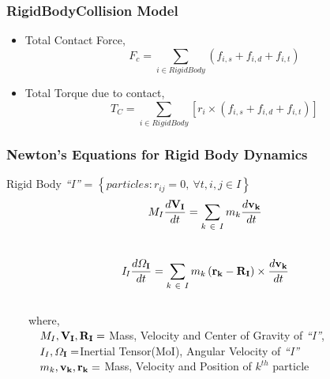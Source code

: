 \documentclass{beamer}
\begin{document}
%
 \begin{frame} %
  \frametitle{RigidBodyCollision Model}
  \begin{itemize}
   \item Total Contact Force, $$F_c = \sum_{i\in RigidBody} \left(f_{i,s} + f_{i,d} + f_{i,t} \right)$$
   \item Total Torque due to contact, $$T_C = \sum_{i\in RigidBody} \left[ r_{i} \times \left(f_{i,s} + f_{i,d} + f_{i,t} \right)\right] $$
  \end{itemize}
 \end{frame}
 
  \begin{frame} %
  \frametitle{Newton's Equations for Rigid Body Dynamics}
    Rigid Body {\it{``I''}} = $\left\lbrace particles : r_{ij} = 0, ~ \forall t , i,j \in I\right\rbrace$ \pause \\
     $$ M_{I}\frac{d{\it{{\bf{V_I}}}}}{dt} = \sum_{k~\in~I} m_{k} \frac{d{\it{{\bf{v_k}}}}}{dt}$$ \\
    $${\bf{\it{I_I}}} \frac{d{\bf{\varOmega _{I}}}}{dt} = \sum_{k~\in~I} m_{k}\left( {\bf{r_k - R_I}}\right) \times \frac{d{\it{{\bf{v_k}}}}}{dt}$$ \\
    ~~~~where, \\
    ~~~~~~$M_I , {\it{\bf{V_I}}}, {\it{\bf{R_I}}} = $ Mass, Velocity and Center of Gravity of {\it{``I''}}, \\
    ~~~~~~$I_I , {{\bf{\varOmega _{I}}}} = $Inertial Tensor(MoI), Angular Velocity of {\it{``I''}} \\
    ~~~~~~$m_k , {\it{{\bf{v_k}}}}, \bf{r_k} =$ Mass, Velocity and Position of $k^{th}$ particle\\
 \end{frame}
\end{document}
